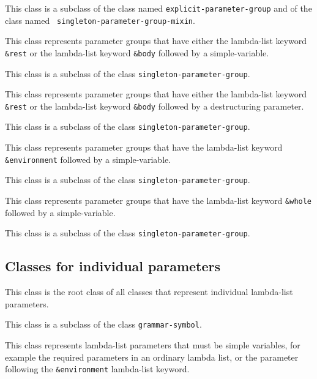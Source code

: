 This class is a subclass of the class named
\texttt{explicit-parameter-group} and of the class named \texttt{
  singleton-parameter-group-mixin}.


This class represents parameter groups that have either the
lambda-list keyword \texttt{\&rest} or the lambda-list keyword
\texttt{\&body} followed by a simple-variable.

This class is a subclass of the class \texttt{singleton-parameter-group}.


This class represents parameter groups that have either the
lambda-list keyword \texttt{\&rest} or the lambda-list keyword
\texttt{\&body} followed by a destructuring parameter.

This class is a subclass of the class \texttt{singleton-parameter-group}.


This class represents parameter groups that have the lambda-list
keyword \texttt{\&environment} followed by a simple-variable.

This class is a subclass of the class \texttt{singleton-parameter-group}.


This class represents parameter groups that have the lambda-list
keyword \texttt{\&whole} followed by a simple-variable.

This class is a subclass of the class \texttt{singleton-parameter-group}.

\subsection{Classes for individual parameters}


This class is the root class of all classes that represent individual
lambda-list parameters.

This class is a subclass of the class \texttt{grammar-symbol}.


This class represents lambda-list parameters that must be simple
variables, for example the required parameters in an ordinary lambda
list, or the parameter following the \texttt{\&environment}
lambda-list keyword.

